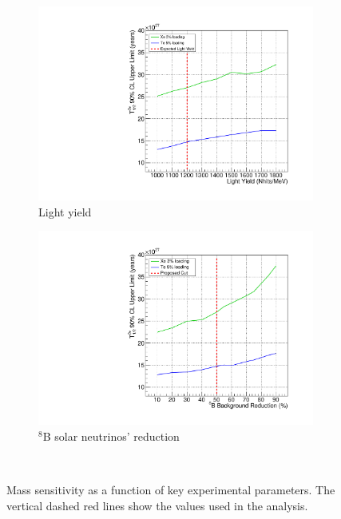 \begin{figure}[!h]
\centering
\begin{subfigure}[b]{0.35\textwidth}
 \includegraphics[width=\textwidth]{dbd/ly_fc.pdf}
 \caption{Light yield}
 \label{fig:scale-ly}
\end{subfigure}
\begin{subfigure}[b]{0.35\textwidth}
 \includegraphics[width=\textwidth]{dbd/b8_reduction_fc.pdf}
 \caption{$^8$B solar neutrinos' reduction}
 \label{fig:scale-b8}
\end{subfigure}\\
\caption{Mass sensitivity as a function of key experimental parameters. The vertical dashed red lines show the values used in the analysis.}
\label{fig:scaling-plots}
\end{figure}

